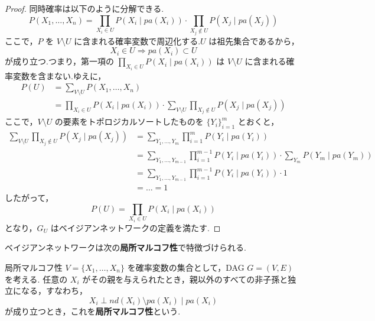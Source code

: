 \documentclass[uplatex, dvipdfmx]{jsarticle}
\begin{document}
\begin{proof}
  同時確率は以下のように分解できる.
  \begin{equation}
      P(X_1, \dots, X_n) = \prod_{X_i \in U} P(X_i \mid pa(X_i)) \cdot \prod_{X_j \notin U} P(X_j \mid pa(X_j))
  \end{equation}
  ここで，$P$ を $V \setminus U$ に含まれる確率変数で周辺化する.$U$ は祖先集合であるから，
  \begin{equation}
      X_i \in U \Rightarrow pa(X_i) \subset U
  \end{equation}
  が成り立つ.つまり，第一項の $\prod_{X_i \in U} P(X_i \mid pa(X_i))$ は $V \setminus U$ に含まれる確率変数を含まない.ゆえに，
  \begin{align*}
      P(U) &= \sum_{V \setminus U} P(X_1, \dots, X_n) \\
      &= \prod_{X_i \in U} P(X_i \mid pa(X_i)) \cdot \sum_{V \setminus U} \prod_{X_j \notin U} P(X_j \mid pa(X_j))
  \end{align*}
  ここで，$V \setminus U$ の要素をトポロジカルソートしたものを $\{Y_i\}_{i=1}^m$ とおくと，
  \begin{align*}
      \sum_{V \setminus U} \prod_{X_j \notin U} P(X_j \mid pa(X_j)) &= \sum_{Y_1, \dots, Y_m} \prod_{i=1}^{m} P(Y_i \mid pa(Y_i)) \\
      &= \sum_{Y_1, \dots, Y_{m-1}} \prod_{i=1}^{m-1} P(Y_i \mid pa(Y_i)) \cdot \sum_{Y_m} P(Y_m \mid pa(Y_m)) \\
      &= \sum_{Y_1, \dots, Y_{m-1}} \prod_{i=1}^{m-1} P(Y_i \mid pa(Y_i)) \cdot 1 \\
      &= \dots = 1
  \end{align*}
  したがって，
  \begin{equation}
      P(U) = \prod_{X_i \in U} P(X_i \mid pa(X_i))
  \end{equation}
  となり，$G_U$ はベイジアンネットワークの定義を満たす.
\end{proof}

\vspace{1em}
ベイジアンネットワークは次の\textbf{局所マルコフ性}で特徴づけられる.

\begin{defn}[label={defn:local_markov}]{局所マルコフ性}
  $V = \{X_1, \dots, X_n\}$ を確率変数の集合として，DAG $G = (V, E)$ を考える.
  任意の $X_i$ がその親を与えられたとき，親以外のすべての非子孫と独立になる，すなわち，
  \begin{equation}
      X_i \perp nd(X_i) \setminus pa(X_i) \mid pa(X_i)
  \end{equation}
  が成り立つとき，これを\textbf{局所マルコフ性}という.
\end{defn}
\end{document}

